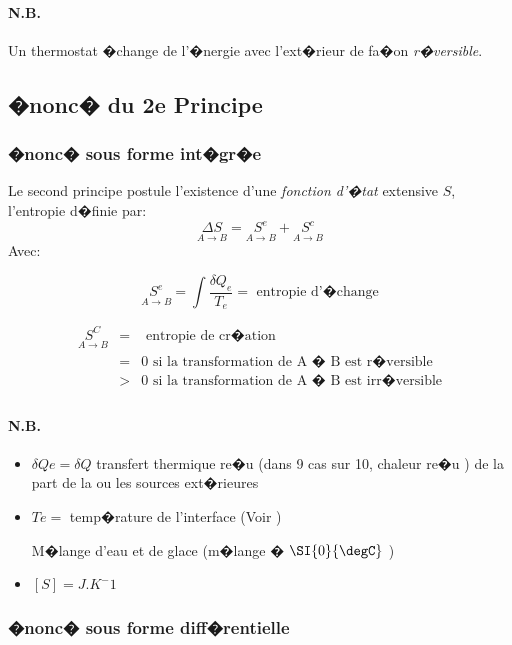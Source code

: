     \paragraph{N.B.}
    Un thermostat �change de l'�nergie avec l'ext�rieur de fa�on \emph{r�versible}.

  \subsection{�nonc� du 2e Principe}

    \subsubsection{�nonc� sous forme int�gr�e}

Le second principe postule l'existence d'une \emph{fonction d'�tat} extensive $ S $, 
l'entropie d�finie par:
\[
 \underset{A \rightarrow B}{\Delta S} = \underset{A \rightarrow B}{S^e} + \underset{A \rightarrow B}{S^c}
\]
Avec:

\[
 \underset{A \rightarrow B}{S^e} = \int \frac{\delta Q_e}{T_e} = \text{ entropie d'�change}
\]

\begin{eqnarray*}
\underset{A \rightarrow B}{S^C} & = & \text{ entropie de cr�ation} \\
				& = & 0 \text{ si la transformation de A � B est r�versible} \\
				& > & 0 \text{ si la transformation de A � B est irr�versible} \\
\end{eqnarray*}

\paragraph{N.B.}
\begin{itemize}
	\item $ \delta Qe = \delta Q $ transfert thermique re�u (dans 9 cas sur 10, chaleur re�u ) de la part de la ou les sources ext�rieures
	\item $ Te = $ temp�rature de l'interface (Voir )
	
				{M�lange d'eau et de glace (m�lange � $ \SI{0}{\degC} $ )}
				
	\item $ [ S ] = J.K^-1 $
\end{itemize}

\subsubsection{�nonc� sous forme diff�rentielle}

